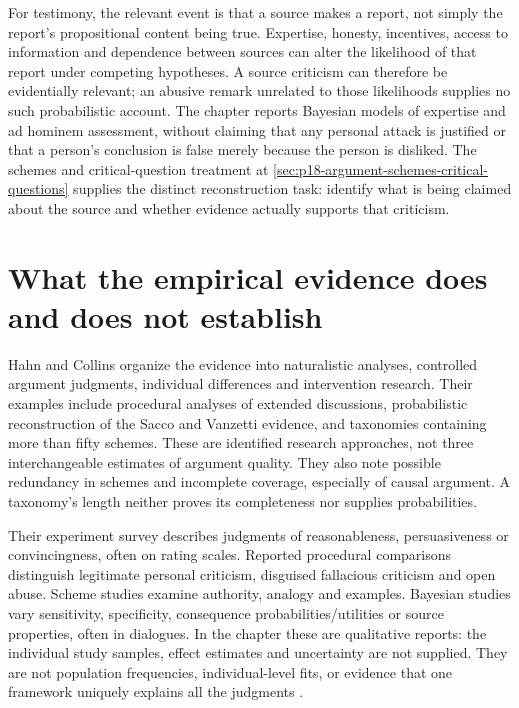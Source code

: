 For testimony, the relevant event is that a source makes a report,
not simply the report's propositional content being true. Expertise,
honesty, incentives, access to information and dependence between
sources can alter the likelihood of that report under competing
hypotheses. A source criticism can therefore be evidentially relevant;
an abusive remark unrelated to those likelihoods supplies no such
probabilistic account. The chapter reports Bayesian models of expertise
and ad hominem assessment, without claiming that any personal attack
is justified or that a person's conclusion is false merely because
the person is disliked. The schemes and critical-question treatment
at \cref{sec:p18-argument-schemes-critical-questions} supplies the
distinct reconstruction task: identify what is being claimed about
the source and whether evidence actually supports that criticism.

\section{What the empirical evidence does and does not establish}

Hahn and Collins organize the evidence into naturalistic analyses,
controlled argument judgments, individual differences and intervention
research. Their examples include procedural analyses of extended
discussions, probabilistic reconstruction of the Sacco and Vanzetti
evidence, and taxonomies containing more than fifty schemes. These
are identified research approaches, not three interchangeable estimates
of argument quality. They also note possible redundancy in schemes
and incomplete coverage, especially of causal argument. A taxonomy's
length neither proves its completeness nor supplies probabilities.

Their experiment survey describes judgments of reasonableness,
persuasiveness or convincingness, often on rating scales. Reported
procedural comparisons distinguish legitimate personal criticism,
disguised fallacious criticism and open abuse. Scheme studies examine
authority, analogy and examples. Bayesian studies vary sensitivity,
specificity, consequence probabilities/utilities or source properties,
often in dialogues. In the chapter these are qualitative reports:
the individual study samples, effect estimates and uncertainty are not
supplied. They are not population frequencies, individual-level fits,
or evidence that one framework uniquely explains all the judgments
\cite[p.~363]{HahnCollins2021ArgumentationTheory}.

